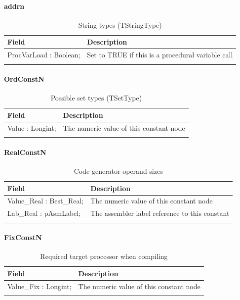\documentclass [a4paper,12pt]{article}
\begin{document}
\paragraph{addrn}\mbox{}

\begin{longtable}{|l|p{10cm}|}
\hline
Field	& Description \\
\hline
\endhead
\hline
\endfoot
\textsf{ProcVarLoad : Boolean;}&
	Set to TRUE if this is a procedural variable call \\
\hline
\caption{String types (TStringType)}
\end{longtable}

\paragraph{OrdConstN}\mbox{}

\begin{longtable}{|l|p{10cm}|}
\hline
Field	& Description \\
\hline
\endhead
\hline
\endfoot
\textsf{Value : Longint;}&
	The numeric value of this constant node \\
\hline
\caption{Possible set types (TSetType)}
\end{longtable}

\paragraph{RealConstN}\mbox{}

\begin{longtable}{|l|p{10cm}|}
\hline
Field	& Description \\
\hline
\endhead
\hline
\endfoot
\textsf{Value{\_}Real : Best{\_}Real;}&
	The numeric value of this constant node \\
\textsf{Lab{\_}Real : pAsmLabel;}&
	The assembler label reference to this constant \\
\hline
\caption{Code generator operand sizes}\label{tab16}
\end{longtable}

\paragraph{FixConstN}\mbox{}

\begin{longtable}{|l|p{10cm}|}
\hline
Field	& Description \\
\hline
\endhead
\hline
\endfoot
\textsf{Value{\_}Fix : Longint;}&
	The numeric value of this constant node \\
\hline
\caption{Required target processor when compiling}
\label{tab17}
\end{longtable}
\end{document}
